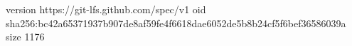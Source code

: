 version https://git-lfs.github.com/spec/v1
oid sha256:bc42a65371937b907de8af59fe4f6618dae6052de5b8b24cf5f6bef36586039a
size 1176
